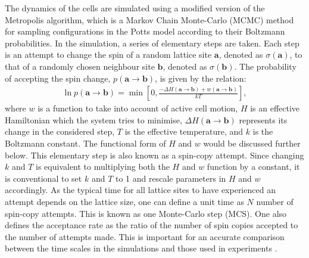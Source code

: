 \documentclass[a4paper,12pt]{article}
\newcommand{\inc}{\Delta}
\begin{document}
The dynamics of the cells are simulated using a modified version of the Metropolis algorithm, which is a Markov Chain Monte-Carlo (MCMC) method for sampling configurations in the Potts model according to their Boltzmann probabilities. In the simulation, a series of elementary steps are taken. Each step is an attempt to change the spin of a random lattice site $\bm{a}$, denoted as $\sigma(\bm{a})$, to that of a randomly chosen neighbour site $\bm{b}$, denoted as $\sigma(\bm{b})$. The probability of accepting the spin change, $p\left(\bm{a} \rightarrow \bm{b}\right)$, is given by the relation:
\begin{eqnarray}
\label{eqn:prob}
\ln p (\bm{a} \rightarrow \bm{b}) = \min \left[0, \frac{-\inc H (\bm{a} \rightarrow \bm{b}) + w (\bm{a} \rightarrow \bm{b})}{kT} \right],
\end{eqnarray}
where $w$ is a function to take into account of active cell motion, $H$ is an effective Hamiltonian which the system tries to minimise,  $\inc H (\bm{a} \rightarrow \bm{b})$ represents its change in the considered step, $T$ is the effective temperature, and $k$ is the Boltzmann constant. The functional form of $H$ and $w$ would be discussed further below. This elementary step is also known as a spin-copy attempt. Since changing $k$ and $T$ is equivalent to multiplying both the $H$ and $w$ function by a constant, it is conventional to set $k$ and $T$ to 1 and rescale parameters in $H$ and $w$ accordingly. As the typical time for all lattice sites to have experienced an attempt depends on the lattice size, one can define a unit time as $N$ number of spin-copy attempts. This is known as one Monte-Carlo step (MCS). One also defines the acceptance rate as the ratio of the number of spin copies accepted to the number of attempts made. This is important for an accurate comparison between the time scales in the simulations and those used in experiments \cite{sanz2010}.
 
\end{document}
